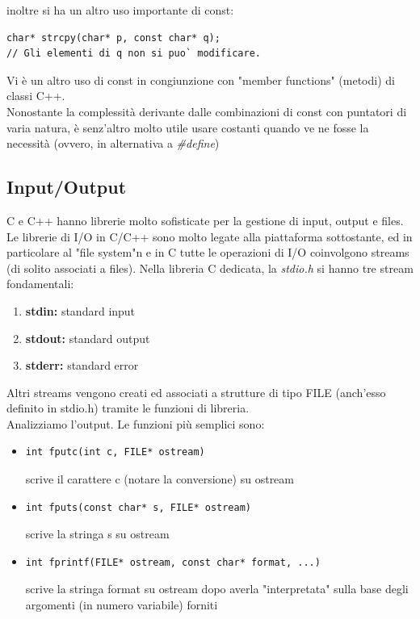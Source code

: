 \documentclass[a4paper,12pt, oneside]{book}
\begin{document}
inoltre si ha un altro uso importante di const:
\begin{verbatim}
char* strcpy(char* p, const char* q);
// Gli elementi di q non si puo` modificare.
\end{verbatim}
Vi è un altro uso di const in congiunzione con "member functions" (metodi) di classi C++.\\
Nonostante la complessità derivante dalle combinazioni di const con puntatori di varia natura, è senz'altro molto utile usare costanti quando ve ne fosse la necessità (ovvero, in alternativa a \textit{\#define})
\subsection{Input/Output}
C e C++ hanno librerie molto sofisticate per la gestione di input, output e files. Le librerie di I/O in C/C++ sono molto legate alla piattaforma
sottostante, ed in particolare al "file system"n e in C tutte le operazioni di I/O coinvolgono streams (di solito
associati a files). Nella libreria C dedicata, la \textit{stdio.h} si hanno tre stream fondamentali:
\begin{enumerate}
\item \textbf{stdin:} standard input
\item \textbf{stdout:} standard output
\item \textbf{stderr:} standard error
\end{enumerate}
Altri streams vengono creati ed associati a strutture di tipo FILE (anch'esso definito in stdio.h) tramite le funzioni di libreria.\\
Analizziamo l'output. Le funzioni più semplici sono:
\begin{itemize}
\item \begin{verbatim}
int fputc(int c, FILE* ostream)
\end{verbatim}
scrive il carattere c (notare la conversione) su ostream

\item \begin{verbatim}
int fputs(const char* s, FILE* ostream)
\end{verbatim}
scrive la stringa s su ostream
\item \begin{verbatim}
int fprintf(FILE* ostream, const char* format, ...)\end{verbatim}
scrive la stringa format su ostream dopo averla "interpretata"
sulla base degli argomenti (in numero variabile) forniti
\end{itemize} 
\end{document}

